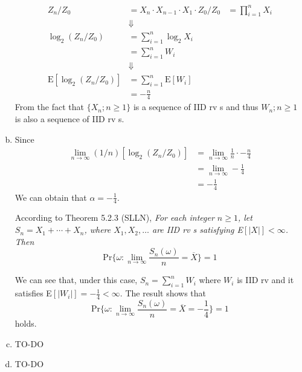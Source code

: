 \documentclass{article}
\begin{document}
\begin{enumerate}[(a)]
            \begin{equation*}
                \begin{aligned}
                    Z_n/Z_0&=X_n\cdot X_{n-1}\cdot X_1\cdot Z_0/Z_0&=\prod_{i=1}^nX_i\\
                    &\Downarrow\\
                    \log_2(Z_n/Z_0)&=\sum_{i=1}^n\log_2X_i\\
                    &=\sum_{i=1}^nW_i\\
                    &\Downarrow\\
                    \text{E}[\log_2(Z_n/Z_0)] &= \sum_{i=1}^n\text{E}[W_i]\\
                    &=-\frac{n}{4}
                \end{aligned}
            \end{equation*}
            From the fact that $\{X_n;n\geq 1\}$ is a sequence of IID rv s and thus ${W_n;n\geq 1}$ is also a sequence of IID rv s.
        \item Since
            \begin{equation*}
                \begin{split}
                    \lim_{n\rightarrow\infty}(1/n)[\log_2(Z_n/Z_0)] &= \lim_{n\rightarrow\infty}\frac{1}{n}\cdot-\frac{n}{4}\\
                    &=\lim_{n\rightarrow\infty}-\frac{1}{4}\\
                    &=-\frac{1}{4}
                \end{split}
            \end{equation*}
            We can obtain that $\alpha=-\frac{1}{4}$.

            According to Theorem 5.2.3 (SLLN), \textit{For each integer $n\geq 1$, let $S_n=X_1+\cdots+X_n$, where $X_1,X_2,\dots$ are IID rv s satisfying \textnormal{E}$[|X|]<\infty$. Then}
            \begin{equation*}
                \text{Pr}\bigg\{\omega:\lim_{n\rightarrow\infty}\frac{S_n(\omega)}{n}=\overline{X}\bigg\}=1
            \end{equation*}

            We can see that, under this case, $S_n=\sum_{i=1}^nW_i$ where $W_i$ is IID rv and it satisfies E$[|W_i|]=-\frac{1}{4}<\infty$. The result shows that 
            \begin{equation*}
                \text{Pr}\bigg\{\omega:\lim_{n\rightarrow\infty}\frac{S_n(\omega)}{n}=\overline{X}=-\frac{1}{4}\bigg\}=1
            \end{equation*}
            holds.
        \item TO-DO
        \item TO-DO 
    \end{enumerate}
\end{document}
